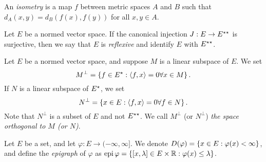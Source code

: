 \documentclass[11pt]{article}
\begin{document}
\begin{definition}
    An \textit{isometry} is a map $f$ between metric spaces $A$ and $B$ such that $d_A(x,y) = d_B(f(x),f(y))$ for all $x,y\in A$.
\end{definition}

\begin{definition}
    Let $E$ be a normed vector space. If the canonical injection $J:E\to E{}^{\star\star}$ is surjective, then we say that $E$ is \textit{reflexive} and identify $E$ with $E{}^{\star\star}$.
\end{definition}

\begin{definition}
    Let $E$ be a normed vector space, and suppose $M$ is a linear subspace of $E$. We set $$M^\perp = \left\{f\in E{}^{\star} : \left\langle f, x\right\rangle=0 \forall x\in M\right\}.$$ If $N$ is a linear subspace of $E{}^{\star}$, we set $$N^\perp = \left\{x\in E: \left\langle f, x\right\rangle=0 \forall f\in N\right\}.$$ Note that $N^\perp$ is a subset of $E$ and not $E{}^{\star\star}$. We call $M^\perp$ (or $N^\perp$) \textit{the space orthogonal to $M$ (or $N$)}.
\end{definition}

\begin{definition}
    Let $E$ be a set, and let $\varphi:E\to (-\infty,\infty]$. We denote $D(\varphi) = \left\{x\in E: \varphi(x)<\infty\right\}$, and define the \textit{epigraph} of $\varphi$ as $\operatorname{epi}\varphi = \left\{[x, \lambda]\in E \times \mathbb{R}:\varphi(x)\leq \lambda \right\}$.
\end{definition}
\end{document}
